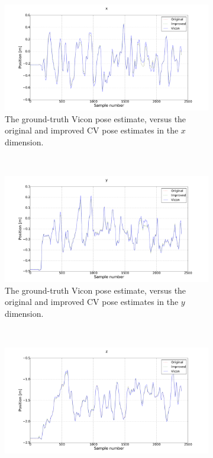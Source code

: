 \begin{figure}
  \begin{subfigure}{0.45\textwidth}
    \includegraphics[clip, trim = 200 50 150 0, width=\textwidth]{figures/chapter3/x}
    \caption{The ground-truth Vicon pose estimate, versus the original and improved CV pose estimates in the $x$ dimension.}
  \label{fig:estimate-x}
  \end{subfigure}
~
  \begin{subfigure}{0.45\textwidth}
    \includegraphics[width=\textwidth]{figures/chapter3/y}
    \caption{The ground-truth Vicon pose estimate, versus the original and improved CV pose estimates in the $y$ dimension.}
  \label{fig:estimate-y}
  \end{subfigure}
~
  \begin{subfigure}{0.45\textwidth}
    \includegraphics[width=\textwidth]{figures/chapter3/z}

\end{subfigure}
\end{figure}
